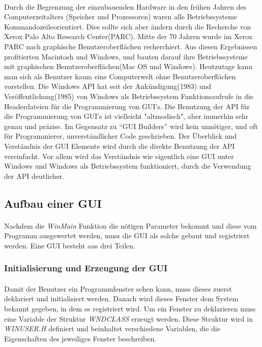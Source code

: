 \paragraph{}
Durch die Begrenzung der einzubauenden Hardware in den frühen Jahren des Computerzeitalters (Speicher und Prozessoren) waren alle Betriebssysteme Kommandozeileorientiert. Dies sollte sich aber ändern durch die Recherche von Xerox Palo Alto Research Center(PARC). Mitte der 70 Jahren wurde im Xerox PARC nach graphische Benutzeroberflächen recherchiert. Aus diesen Ergebnissen profitierten Macintosh und Windows, und bauten darauf ihre Betriebssysteme mit graphischen Benutzeroberflächen(Mac OS und Windows). Heutzutage kann man sich als Benutzer kaum eine Computerwelt ohne Benutzeroberflächen vorstellen. Die Windows API hat seit der Ankündigung(1983) und Veröffentlichung(1985) von Windows als Betriebssystem Funktionsaufrufe in die Headerdateien für die Programmierung von GUI's. Die Benutzung der API für die Programmierung von GUI's ist vielleicht "altmodisch", aber immerhin sehr genau und präzise. Im Gegensatz zu "`GUI Builders"' wird kein unnötiger, und oft für Programmierer, unverständlicher Code geschrieben. Der Überblick und Verständnis der GUI Elemente wird durch die direkte Benutzung der API vereinfacht. Vor allem wird das Verständnis wie eigentlich eine GUI unter Windows und Windows als Betriebssystem funktioniert, durch die Verwendung der API deutlicher.

\subsection{Aufbau einer GUI}
\paragraph{}
Nachdem die \textit{WinMain} Funktion die nötigen Parameter bekommt und diese vom Programm ausgewertet werden, muss die GUI als solche gebaut und registriert werden. Eine GUI besteht aus drei Teilen.


\subsubsection{Initialisierung und Erzeugung der GUI}\label{Ini und Erzeugung}
\paragraph{}
Damit der Benutzer ein Programmfenster sehen kann, muss dieses zuerst deklariert und initialisiert werden. Danach wird dieses Fenster dem System bekannt gegeben, in dem es registriert wird. Um ein Fenster zu deklarieren muss eine Variable der Struktur \textit{WNDCLASS} erzeugt werden. Diese Struktur wird in \textit{WINUSER.H} definiert und beinhaltet verschiedene Variablen, die die Eigenschaften des jeweiliges Fenster beschreiben.



